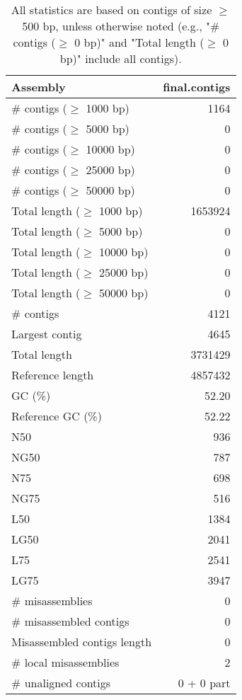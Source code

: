 \documentclass[12pt,a4paper]{article}
\begin{document}
\begin{table}[ht]
\begin{center}
\caption{All statistics are based on contigs of size $\geq$ 500 bp, unless otherwise noted (e.g., "\# contigs ($\geq$ 0 bp)" and "Total length ($\geq$ 0 bp)" include all contigs).}
\begin{tabular}{|l*{1}{|r}|}
\hline
Assembly & final.contigs \\ \hline
\# contigs ($\geq$ 1000 bp) & 1164 \\ \hline
\# contigs ($\geq$ 5000 bp) & 0 \\ \hline
\# contigs ($\geq$ 10000 bp) & 0 \\ \hline
\# contigs ($\geq$ 25000 bp) & 0 \\ \hline
\# contigs ($\geq$ 50000 bp) & 0 \\ \hline
Total length ($\geq$ 1000 bp) & 1653924 \\ \hline
Total length ($\geq$ 5000 bp) & 0 \\ \hline
Total length ($\geq$ 10000 bp) & 0 \\ \hline
Total length ($\geq$ 25000 bp) & 0 \\ \hline
Total length ($\geq$ 50000 bp) & 0 \\ \hline
\# contigs & 4121 \\ \hline
Largest contig & 4645 \\ \hline
Total length & 3731429 \\ \hline
Reference length & 4857432 \\ \hline
GC (\%) & 52.20 \\ \hline
Reference GC (\%) & 52.22 \\ \hline
N50 & 936 \\ \hline
NG50 & 787 \\ \hline
N75 & 698 \\ \hline
NG75 & 516 \\ \hline
L50 & 1384 \\ \hline
LG50 & 2041 \\ \hline
L75 & 2541 \\ \hline
LG75 & 3947 \\ \hline
\# misassemblies & 0 \\ \hline
\# misassembled contigs & 0 \\ \hline
Misassembled contigs length & 0 \\ \hline
\# local misassemblies & 2 \\ \hline
\# unaligned contigs & 0 + 0 part \\ \hline

\end{tabular}
\end{center}
\end{table}
\end{document}
